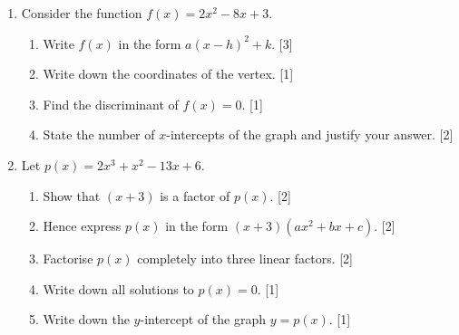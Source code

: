 \documentclass[12pt, twoside]{article}
\begin{document}
\begin{enumerate}[itemsep=0.15cm]

\newpage

\item[3.] [Maximum mark: 7]

Consider the function $f(x) = 2x^2 - 8x + 3$.

\begin{enumerate}[itemsep=0.15cm]
  \item Write $f(x)$ in the form $a(x - h)^2 + k$. \hfill [3]
  \item Write down the coordinates of the vertex. \hfill [1]
  \item Find the discriminant of $f(x) = 0$. \hfill [1]
  \item State the number of $x$-intercepts of the graph
  and justify your answer. \hfill [2]
\end{enumerate}


\newpage

\item[4.] [Maximum mark: 8]

Let $p(x) = 2x^3 + x^2 - 13x + 6$.

\begin{enumerate}[itemsep=0.15cm]
  \item Show that $(x + 3)$ is a factor of $p(x)$. \hfill [2]
  \item Hence express $p(x)$ in the form
  $(x + 3)(ax^2 + bx + c)$. \hfill [2]
  \item Factorise $p(x)$ completely into three
  linear factors. \hfill [2]
  \item Write down all solutions to $p(x) = 0$. \hfill [1]
  \item Write down the $y$-intercept of the graph
  $y = p(x)$. \hfill [1]
\end{enumerate}


\end{enumerate}
\end{document}
